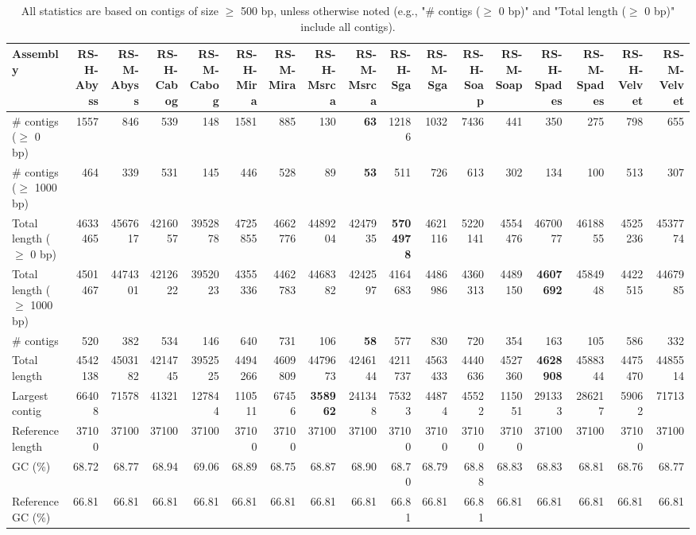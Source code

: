 \documentclass[12pt,a4paper]{article}
\begin{document}
\begin{table}[ht]
\begin{center}
\caption{All statistics are based on contigs of size $\geq$ 500 bp, unless otherwise noted (e.g., "\# contigs ($\geq$ 0 bp)" and "Total length ($\geq$ 0 bp)" include all contigs).}
\begin{tabular}{|l*{16}{|r}|}
\hline
Assembly & RS-H-Abyss & RS-M-Abyss & RS-H-Cabog & RS-M-Cabog & RS-H-Mira & RS-M-Mira & RS-H-Msrca & RS-M-Msrca & RS-H-Sga & RS-M-Sga & RS-H-Soap & RS-M-Soap & RS-H-Spades & RS-M-Spades & RS-H-Velvet & RS-M-Velvet \\ \hline
\# contigs ($\geq$ 0 bp) & 1557 & 846 & 539 & 148 & 1581 & 885 & 130 & {\bf 63} & 12186 & 1032 & 7436 & 441 & 350 & 275 & 798 & 655 \\ \hline
\# contigs ($\geq$ 1000 bp) & 464 & 339 & 531 & 145 & 446 & 528 & 89 & {\bf 53} & 511 & 726 & 613 & 302 & 134 & 100 & 513 & 307 \\ \hline
Total length ($\geq$ 0 bp) & 4633465 & 4567617 & 4216057 & 3952878 & 4725855 & 4662776 & 4489204 & 4247935 & {\bf 5704978} & 4621116 & 5220141 & 4554476 & 4670077 & 4618855 & 4525236 & 4537774 \\ \hline
Total length ($\geq$ 1000 bp) & 4501467 & 4474301 & 4212622 & 3952023 & 4355336 & 4462783 & 4468382 & 4242597 & 4164683 & 4486986 & 4360313 & 4489150 & {\bf 4607692} & 4584948 & 4422515 & 4467985 \\ \hline
\# contigs & 520 & 382 & 534 & 146 & 640 & 731 & 106 & {\bf 58} & 577 & 830 & 720 & 354 & 163 & 105 & 586 & 332 \\ \hline
Total length & 4542138 & 4503182 & 4214745 & 3952525 & 4494266 & 4609809 & 4479673 & 4246144 & 4211737 & 4563433 & 4440636 & 4527360 & {\bf 4628908} & 4588344 & 4475470 & 4485514 \\ \hline
Largest contig & 66408 & 71578 & 41321 & 127844 & 110511 & 67456 & {\bf 358962} & 241348 & 75323 & 44874 & 45522 & 115051 & 291333 & 286217 & 59062 & 71713 \\ \hline
Reference length & 37100 & 37100 & 37100 & 37100 & 37100 & 37100 & 37100 & 37100 & 37100 & 37100 & 37100 & 37100 & 37100 & 37100 & 37100 & 37100 \\ \hline
GC (\%) & 68.72 & 68.77 & 68.94 & 69.06 & 68.89 & 68.75 & 68.87 & 68.90 & 68.70 & 68.79 & 68.88 & 68.83 & 68.83 & 68.81 & 68.76 & 68.77 \\ \hline
Reference GC (\%) & 66.81 & 66.81 & 66.81 & 66.81 & 66.81 & 66.81 & 66.81 & 66.81 & 66.81 & 66.81 & 66.81 & 66.81 & 66.81 & 66.81 & 66.81 & 66.81 \\ \hline

\end{tabular}
\end{center}
\end{table}
\end{document}
